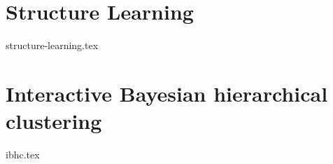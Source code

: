 \chapter{Structure Learning}
\label{chap:structure-learning}
{structure-learning.tex}

\chapter{Interactive Bayesian hierarchical clustering}
\label{chap:ibhc}
{ibhc.tex}
